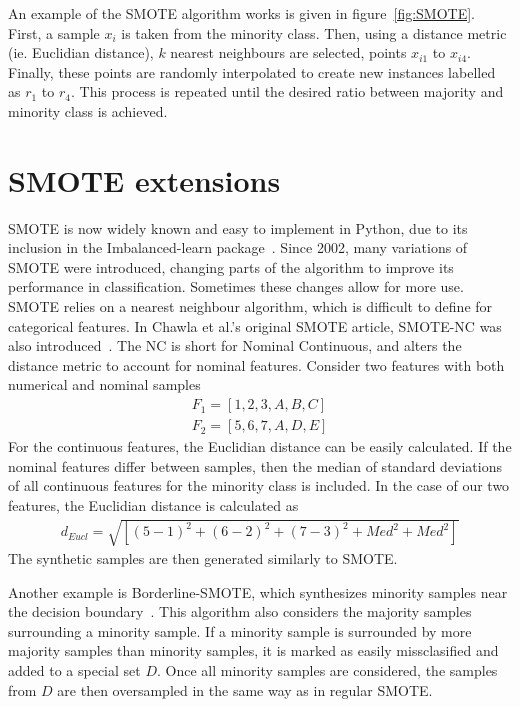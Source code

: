 An example of the SMOTE algorithm works is given in figure~\ref{fig:SMOTE}. First, a sample $x_i$ is taken from the minority class. Then, using a distance metric (ie. Euclidian distance), $k$ nearest neighbours are selected, points $x_{i1}$ to $x_{i4}$. Finally, these points are randomly interpolated to create new instances labelled as $r_1$ to $r_4$. This process is repeated until the desired ratio between majority and minority class is achieved. 

\section{SMOTE extensions}
SMOTE is now widely known and easy to implement in Python, due to its inclusion in the Imbalanced-learn package~\cite{Lemaitre2017Imbalanced-learn:Learning}. Since 2002, many variations of SMOTE were introduced, changing parts of the algorithm to improve its performance in classification. Sometimes these changes allow for more use. SMOTE relies on a nearest neighbour algorithm, which is difficult to define for categorical features. In Chawla et al.'s original SMOTE article, SMOTE-NC was also introduced~\cite{Chawla2002SMOTE:Technique}. The NC is short for Nominal Continuous, and alters the distance metric to account for nominal features. Consider two features with both numerical and nominal samples
\begin{align}
    F_1 = [1,2,3,A,B,C]  \\
    F_2 = [5,6,7,A,D,E]
\end{align}
For the continuous features, the Euclidian distance can be easily calculated. If the nominal features differ between samples, then the median of standard deviations of all continuous features for the minority class is included. In the case of our two features, the Euclidian distance is calculated as
\begin{align}
    d_{Eucl} = \sqrt{[(5-1)^2 + (6-2)^2 + (7-3)^2 + Med^2 + Med^2]}
\end{align}
The synthetic samples are then generated similarly to SMOTE.

Another example is Borderline-SMOTE, which synthesizes minority samples near the decision boundary~\cite{Han2005Borderline-SMOTE:Learning}. This algorithm also considers the majority samples surrounding a minority sample. If a minority sample is surrounded by more majority samples than minority samples, it is marked as easily missclasified and added to a special set $D$. Once all minority samples are considered, the samples from $D$ are then oversampled in the same way as in regular SMOTE.

